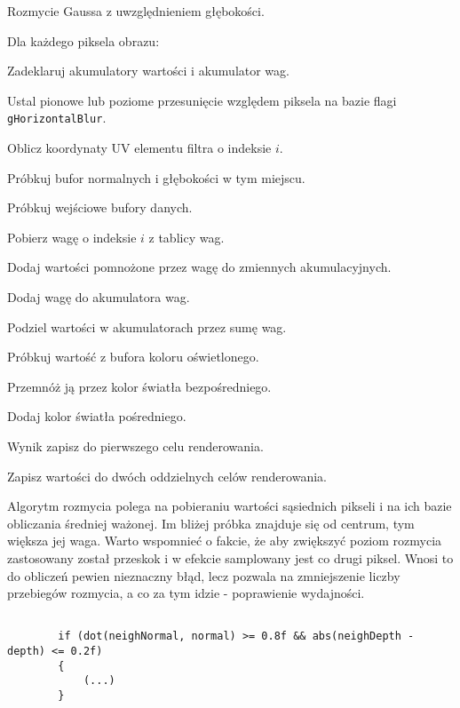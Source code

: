 		\begin{algorithm}[H]
			\small
			\label{alg_6_B}
			\caption{Rozmycie Gaussa z uwzględnieniem głębokości.}	
			Dla każdego piksela obrazu:
			\Indp
			
			Zadeklaruj akumulatory wartości i akumulator wag.
			
			Ustal pionowe lub poziome przesunięcie względem piksela na bazie flagi \texttt{gHorizontalBlur}.
			
			{
				Oblicz koordynaty UV elementu filtra o indeksie \(i\).
				
				Próbkuj bufor normalnych i głębokości w tym miejscu.
				
				{
					Próbkuj wejściowe bufory danych.
					
					Pobierz wagę o indeksie \(i\) z tablicy wag.
					
					Dodaj wartości pomnożone przez wagę do zmiennych akumulacyjnych.
					
					Dodaj wagę do akumulatora wag.
				}
			}
		
			Podziel wartości w akumulatorach przez sumę wag.
			
			{
				Próbkuj wartość z bufora koloru oświetlonego.
				
				Przemnóż ją przez kolor światła bezpośredniego.
				
				Dodaj kolor światła pośredniego.
				
				Wynik zapisz do pierwszego celu renderowania.
			}
			\Else
			{
				Zapisz wartości do dwóch oddzielnych celów renderowania.
			}
			
			\Indm
		\end{algorithm}
		\flushbottom\pagebreak
		Algorytm rozmycia polega na pobieraniu wartości sąsiednich pikseli i na ich bazie obliczania średniej ważonej. Im bliżej próbka znajduje się od centrum, tym większa jej waga. Warto wspomnieć o fakcie, że aby zwiększyć poziom rozmycia zastosowany został przeskok i w efekcie samplowany jest co drugi piksel. Wnosi to do obliczeń pewien nieznaczny błąd, lecz pozwala na zmniejszenie liczby przebiegów rozmycia, a co za tym idzie - poprawienie wydajności.
	
		\begin{lstlisting}[language=HLSL,caption={Warunek rozmycia Gaussa.},label={lst_6_G}]
		
		if (dot(neighNormal, normal) >= 0.8f && abs(neighDepth - depth) <= 0.2f)
		{
			(...)
		}
		
		\end{lstlisting}
		
